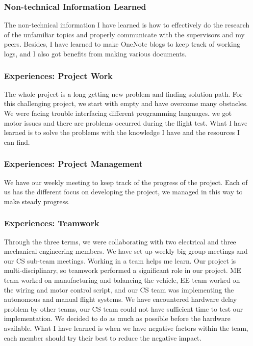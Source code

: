 \documentclass[onecolumn, draftclsnofoot,10pt, compsoc]{IEEEtran}
\begin{document}
\subsubsection{Non-technical Information Learned}
The non-technical information I have learned is how to effectively do the research of the unfamiliar topics and properly communicate with the supervisors and my peers. Besides, I have learned to make OneNote blogs to keep track of working logs, and I also got benefits from making various documents.

\subsubsection{Experiences: Project Work}
The whole project is a long getting new problem and finding solution path. For this challenging project, we start with empty and have overcome many obstacles. We were facing trouble interfacing different programming languages. we got motor issues and there are problems occurred during the flight test. What I have learned is to solve the problems with the knowledge I have and the resources I can find.

\subsubsection{Experiences: Project Management}
We have our weekly meeting to keep track of the progress of the project. Each of us has the different focus on developing the project, we managed in this way to make steady progress.

\subsubsection{Experiences: Teamwork}
Through the three terms, we were collaborating with two electrical and three mechanical engineering members. We have set up weekly big group meetings and our CS sub-team meetings. Working in a team helps me learn. Our project is multi-disciplinary, so teamwork performed a significant role in our project. ME team worked on manufacturing and balancing the vehicle, EE team worked on the wiring and motor control script, and our CS team was implementing the autonomous and manual flight systems. We have encountered hardware delay problem by other teams, our CS team could not have sufficient time to test our implementation. We decided to do as much as possible before the hardware available. What I have learned is when we have negative factors within the team, each member should try their best to reduce the negative impact.
\end{document}
